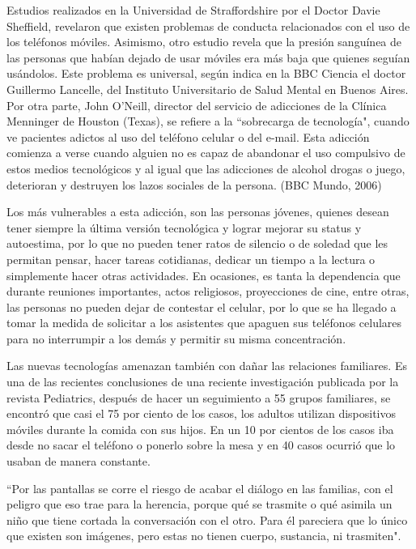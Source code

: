 \documentclass[10pt,a4paper]{article}
\begin{document}
  Estudios realizados en la Universidad de Straffordshire por el Doctor Davie Sheffield, revelaron que existen problemas de conducta relacionados con el uso de los tel{\'e}fonos m{\'o}viles. Asimismo, otro estudio revela que la presi{\'o}n sangu{\'i}nea de las personas que hab{\'i}an dejado de usar m{\'o}viles era m{\'a}s baja que quienes segu{\'i}an us{\'a}ndolos. Este problema es universal, seg{\'u}n indica en la BBC Ciencia el doctor Guillermo Lancelle, del Instituto Universitario de Salud Mental en Buenos Aires. Por otra parte, John O'Neill, director del servicio de adicciones de la Cl{\'i}nica Menninger de Houston (Texas), se refiere a la ``sobrecarga de tecnolog{\'i}a", cuando ve pacientes adictos al uso del tel{\'e}fono celular o del e-mail. Esta adicci{\'o}n comienza a verse cuando alguien no es capaz de abandonar el uso compulsivo de estos medios tecnol{\'o}gicos y al igual que las adicciones de alcohol drogas o juego, deterioran y destruyen los lazos sociales de la persona. (BBC Mundo, 2006)  

Los m{\'a}s vulnerables a esta adicci{\'o}n, son las personas j{\'o}venes, quienes desean tener siempre la {\'u}ltima versi{\'o}n tecnol{\'o}gica y lograr mejorar su status y autoestima, por lo que no pueden tener ratos de silencio o de soledad que les permitan pensar, hacer tareas cotidianas, dedicar un tiempo a la lectura o simplemente hacer otras actividades. En ocasiones, es tanta la dependencia que durante reuniones importantes, actos religiosos, proyecciones de cine, entre otras, las personas no pueden dejar de contestar el celular, por lo que se ha llegado a tomar la medida de solicitar a los asistentes que apaguen sus tel{\'e}fonos celulares para no interrumpir a los dem{\'a}s y permitir su misma concentraci{\'o}n.  

Las nuevas tecnolog{\'i}as amenazan tambi{\'e}n con da{\~n}ar las relaciones familiares. Es una de las recientes conclusiones de una reciente investigaci{\'o}n publicada por la revista Pediatrics, despu{\'e}s de hacer un seguimiento a 55 grupos familiares, se encontr{\'o} que casi el 75 por ciento de los casos, los adultos utilizan dispositivos m{\'o}viles durante la comida con sus hijos. En un 10 por cientos de los casos iba desde no sacar el tel{\'e}fono o ponerlo sobre la mesa y en 40 casos ocurri{\'o} que lo usaban de manera constante.

``Por las pantallas se corre el riesgo de acabar el di{\'a}logo en las familias, con el peligro que eso trae para la herencia, porque qu{\'e} se trasmite o qu{\'e} asimila un ni{\~n}o que tiene cortada la conversaci{\'o}n con el otro. Para {\'e}l pareciera que lo {\'u}nico que existen son im{\'a}genes, pero estas no tienen cuerpo, sustancia, ni trasmiten".
\end{document}
